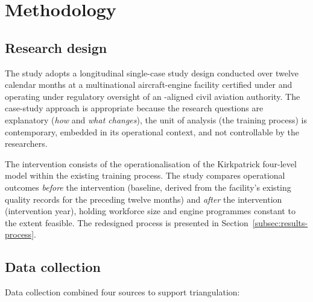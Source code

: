 \section{Methodology}
\label{sec:methodology}

\subsection{Research design}
\label{subsec:design}

The study adopts a longitudinal single-case study design
\citep{Patel2023,ORreilly2024} conducted over twelve calendar months at a
multinational aircraft-engine \MRO{} facility certified under \AS{} and
operating under regulatory oversight of an \ICAO{}-aligned civil aviation
authority. The case-study approach is appropriate because the research
questions are explanatory (\textit{how} and \textit{what changes}), the
unit of analysis (the training process) is contemporary, embedded in its
operational context, and not controllable by the researchers.

The intervention consists of the operationalisation of the Kirkpatrick
four-level model within the existing training process. The study compares
operational outcomes \textit{before} the intervention (baseline, derived from
the facility's existing quality records for the preceding twelve months) and
\textit{after} the intervention (intervention year), holding workforce size
and engine programmes constant to the extent feasible. The redesigned process
is presented in Section~\ref{subsec:results-process}.

\subsection{Data collection}
\label{subsec:data}

Data collection combined four sources to support triangulation:

